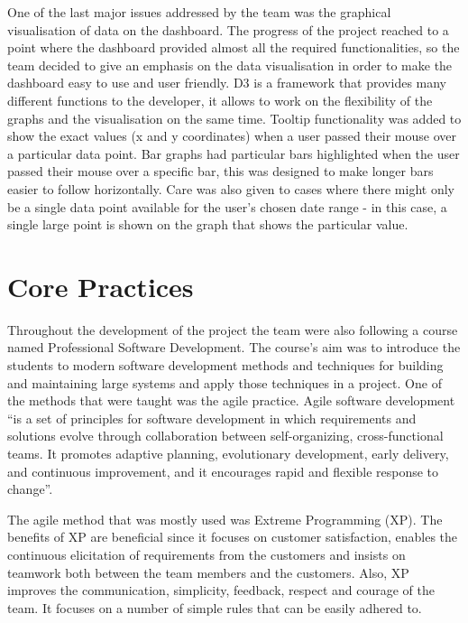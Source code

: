\documentclass{l3proj}
\begin{document}
One of the last major issues addressed by the team was the graphical visualisation of data on the dashboard. The progress of the project reached to a point where the dashboard provided almost all the required functionalities, so the team decided to give an emphasis on the data visualisation in order to make the dashboard easy to use and user friendly. D3 is a framework that provides many different functions to the developer, it allows to work on the flexibility of the graphs and the visualisation on the same time. Tooltip functionality was added to show the exact values (x and y coordinates) when a user passed their mouse over a particular data point. Bar graphs had particular bars highlighted when the user passed their mouse over a specific bar, this was designed to make longer bars easier to follow horizontally. Care was also given to cases where there might only be a single data point available for the user's chosen date range - in this case, a single large point is shown on the graph that shows the particular value.

\section{Core Practices}
\label {sec:core-practices}

Throughout the development of the project the team were also following a course named Professional Software Development.
The course's aim was to introduce the students to modern software development methods and techniques for building and
maintaining large systems and apply those techniques in a project. One of the methods that were taught
was the agile practice. Agile software development ``is a set of principles for software development in
which requirements and solutions evolve through collaboration between self-organizing, cross-functional teams.
It promotes adaptive planning, evolutionary development, early delivery, and continuous improvement, and it encourages
rapid and flexible response to change''.

The agile method that was mostly used was Extreme Programming (XP). The benefits of XP are beneficial since it focuses on
customer satisfaction, enables the continuous elicitation of requirements from the customers and insists on teamwork
both between the team members and the customers. Also, XP improves the communication, simplicity, feedback, respect and
courage of the team. It focuses on a number of simple rules that can be easily adhered to.
\end{document}
